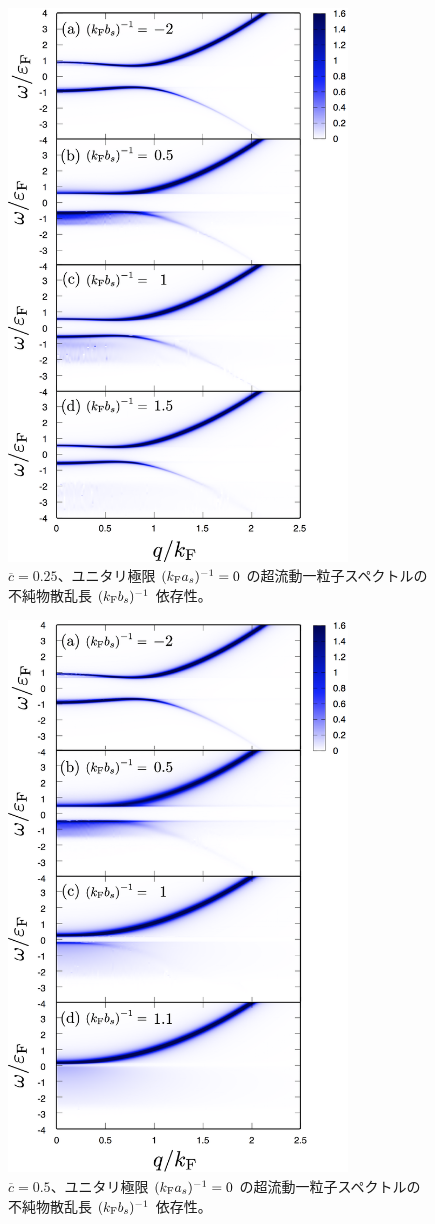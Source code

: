 \begin{figure}[t]
\centering
\includegraphics[width=90mm]{eps/bcsl-spec-c0250.eps}
\caption{$\overline{c}=0.25$、ユニタリ極限 $(k_{\text{F}} a_s)^{-1}=0$ の超流動一粒子スペクトルの不純物散乱長 $(k_{\text{F}} b_s)^{-1}$ 依存性。}
\label{fig:bcsl:imp:map-c0250}
\end{figure}
\begin{figure}[t]
\centering
\includegraphics[width=90mm]{eps/bcsl-spec-c0500.eps}
\caption{$\overline{c}=0.5$、ユニタリ極限 $(k_{\text{F}} a_s)^{-1}=0$  の超流動一粒子スペクトルの不純物散乱長 $(k_{\text{F}} b_s)^{-1}$ 依存性。}
\label{fig:bcsl:imp:map-c0500}
\end{figure}

